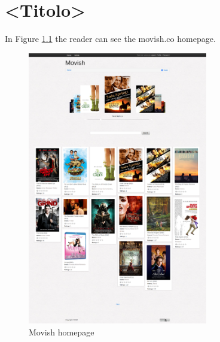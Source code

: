\chapter{<Titolo>}
\label{chapter:<label3>}

In Figure \ref{fig:movish_homepage} the reader can see the movish.co homepage. 

\begin{figure}
  \centering
  \includegraphics[width=0.7\textwidth]{figures/movish-homepage.png}
  \caption{Movish homepage}
  \label{fig:movish_homepage}
\end{figure}

\acresetall